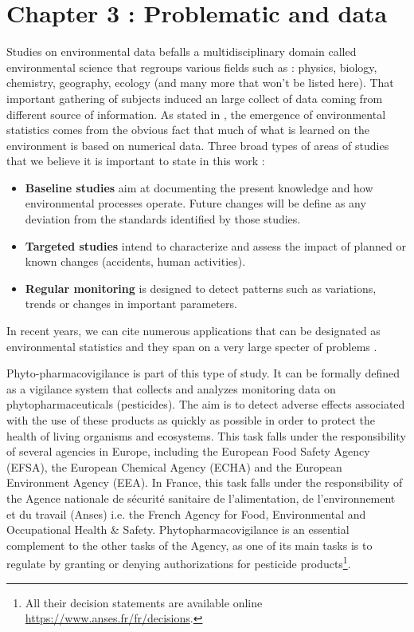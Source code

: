 \chapter{Chapter 3 : Problematic and data}\label{chp:3}

\minitoc

Studies on environmental data befalls a multidisciplinary domain called environmental science that regroups various fields such as : physics, biology, chemistry, geography, ecology (and many more that won't be listed here). That important gathering of subjects induced an large collect of data coming from different source of information. As stated in \cite{Manly2008}, the emergence of environmental statistics comes from the obvious fact that much of what is learned on the environment is based on numerical data. Three broad types of areas of studies that we believe it is important to state in this work : 

\begin{itemize}
    \item \textbf{Baseline studies} aim at documenting the present knowledge and how environmental processes operate. Future changes will be define as any deviation from the standards identified by those studies.
    \item \textbf{Targeted studies} intend to characterize and assess the impact of planned or known changes (accidents, human activities). 
    \item \textbf{Regular monitoring} is designed to detect patterns such as variations, trends or changes in important parameters.  
\end{itemize}
In recent years, we can cite numerous applications that can be designated as environmental statistics and they span on a very large specter of problems \cite{BUNCE_2018,Harvell1999,Hoeoek2013,Zheng2021,Zhao2010,Shi2022,Ozgul2010,Mori2012}. 

Phyto-pharmacovigilance is part of this type of study. It can be formally defined as a vigilance system that collects and analyzes monitoring data on phytopharmaceuticals (pesticides). The aim is to detect adverse effects associated with the use of these products as quickly as possible in order to protect the health of living organisms and ecosystems. This task falls under the responsibility of several agencies in Europe, including the European Food Safety Agency (EFSA), the European Chemical Agency (ECHA) and the European Environment Agency (EEA). In France, this task falls under the responsibility of the Agence nationale de sécurité sanitaire de l’alimentation, de l’environnement et du travail (Anses) i.e. the French Agency for Food, Environmental and Occupational Health \& Safety. Phytopharmacovigilance is an essential complement to the other tasks of the Agency, as one of its main tasks is to regulate by granting or denying authorizations for pesticide products\footnote{All their decision statements are available online \url{https://www.anses.fr/fr/decisions}.}. 

